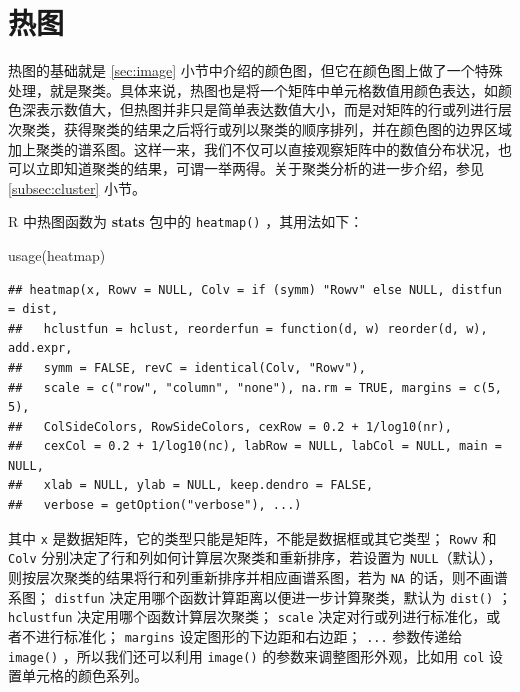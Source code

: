 \documentclass[
  b5paper,
  UTF8,twoside]{book}
\newenvironment{Shaded}{\begin{snugshade}}{\end{snugshade}}
\newcommand{\FunctionTok}[1]{\textcolor[rgb]{0.00,0.00,0.00}{#1}}
\newcommand{\NormalTok}[1]{#1}
\begin{document}
\hypertarget{ux70edux56fe}{%
\section{热图}\label{ux70edux56fe}}

热图的基础就是 \ref{sec:image} 小节中介绍的颜色图，但它在颜色图上做了一个特殊处理，就是聚类。具体来说，热图也是将一个矩阵中单元格数值用颜色表达，如颜色深表示数值大，但热图并非只是简单表达数值大小，而是对矩阵的行或列进行层次聚类，获得聚类的结果之后将行或列以聚类的顺序排列，并在颜色图的边界区域加上聚类的谱系图。这样一来，我们不仅可以直接观察矩阵中的数值分布状况，也可以立即知道聚类的结果，可谓一举两得。关于聚类分析的进一步介绍，参见 \ref{subsec:cluster}
小节。

R 中热图函数为 \textbf{stats} 包中的 \texttt{heatmap()} ，其用法如下：

\begin{Shaded}
\begin{Highlighting}[]
\FunctionTok{usage}\NormalTok{(heatmap)}
\end{Highlighting}
\end{Shaded}

\begin{verbatim}
## heatmap(x, Rowv = NULL, Colv = if (symm) "Rowv" else NULL, distfun = dist,
##   hclustfun = hclust, reorderfun = function(d, w) reorder(d, w), add.expr,
##   symm = FALSE, revC = identical(Colv, "Rowv"),
##   scale = c("row", "column", "none"), na.rm = TRUE, margins = c(5, 5),
##   ColSideColors, RowSideColors, cexRow = 0.2 + 1/log10(nr),
##   cexCol = 0.2 + 1/log10(nc), labRow = NULL, labCol = NULL, main = NULL,
##   xlab = NULL, ylab = NULL, keep.dendro = FALSE,
##   verbose = getOption("verbose"), ...)
\end{verbatim}

其中 \texttt{x} 是数据矩阵，它的类型只能是矩阵，不能是数据框或其它类型； \texttt{Rowv} 和 \texttt{Colv} 分别决定了行和列如何计算层次聚类和重新排序，若设置为 \texttt{NULL}（默认），则按层次聚类的结果将行和列重新排序并相应画谱系图，若为 \texttt{NA} 的话，则不画谱系图； \texttt{distfun} 决定用哪个函数计算距离以便进一步计算聚类，默认为 \texttt{dist()} ； \texttt{hclustfun} 决定用哪个函数计算层次聚类； \texttt{scale} 决定对行或列进行标准化，或者不进行标准化； \texttt{margins} 设定图形的下边距和右边距； \texttt{...} 参数传递给 \texttt{image()} ，所以我们还可以利用 \texttt{image()} 的参数来调整图形外观，比如用 \texttt{col} 设置单元格的颜色系列。
\end{document}

